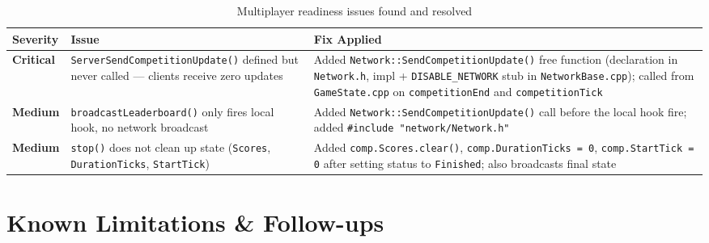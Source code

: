 \documentclass[12pt,a4paper]{article}
\begin{document}
\begin{table}[h!]
\centering
\begin{tabularx}{\linewidth}{l >{\raggedright\arraybackslash}p{4.2cm} X}
\toprule
\textbf{Severity} & \textbf{Issue} & \textbf{Fix Applied} \\
\midrule
\textcolor{orcred}{\textbf{Critical}} &
  \texttt{ServerSendCompetition\-Update()} defined but never called --- clients receive zero updates &
  Added \texttt{Network::SendCompetitionUpdate()} free function (declaration in \texttt{Network.h},
  impl + \texttt{DISABLE\_NETWORK} stub in \texttt{NetworkBase.cpp});
  called from \texttt{GameState.cpp} on \texttt{competitionEnd} and \texttt{competitionTick} \\
\textcolor{warnamber}{\textbf{Medium}} &
  \texttt{broadcastLeaderboard()} only fires local hook, no network broadcast &
  Added \texttt{Network::SendCompetitionUpdate()} call before the local hook fire;
  added \texttt{\#include "network/Network.h"} \\
\textcolor{warnamber}{\textbf{Medium}} &
  \texttt{stop()} does not clean up state (\texttt{Scores}, \texttt{Duration\-Ticks}, \texttt{StartTick}) &
  Added \texttt{comp.Scores.clear()}, \texttt{comp.DurationTicks = 0}, \texttt{comp.StartTick = 0}
  after setting status to \texttt{Finished}; also broadcasts final state \\
\bottomrule
\end{tabularx}
\caption{Multiplayer readiness issues found and resolved}
\end{table}

\section{Known Limitations \& Follow-ups}
\end{document}
